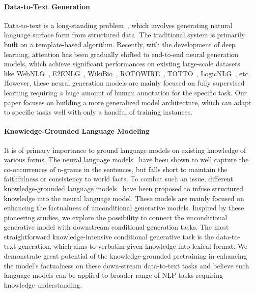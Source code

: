 \documentclass[11pt,a4paper]{article}
\begin{document}
\paragraph{Data-to-Text Generation}
Data-to-text is a long-standing problem~\cite{kukich1983design,reiter1997building}, which involves generating natural language surface form from structured data. The traditional system is primarily built on a template-based algorithm. Recently, with the development of deep learning, attention has been gradually shifted to end-to-end neural generation models, which achieve significant performances on existing large-scale datasets like WebNLG~\cite{shimorina2018handling}, E2ENLG~\cite{dusek2019e2e}, WikiBio~\cite{lebret2016neural}, ROTOWIRE~\cite{wiseman-etal-2017-challenges}, TOTTO~\cite{parikh2020totto}, LogicNLG~\cite{chen2020logical}, etc. However, these neural generation models are mainly focused on fully supervised learning requiring a huge amount of human annotation for the specific task. Our paper focuses on building a more generalized model architecture, which can adapt to specific tasks well with only a handful of training instances. 

\paragraph{Knowledge-Grounded Language Modeling}
It is of primary importance to ground language models on existing knowledge of various forms. The neural language models~\cite{bengio2003neural} have been shown to well capture the co-occurrences of n-grams in the sentences, but falls short to maintain the faithfulness or consistency to world facts. To combat such an issue, different knowledge-grounded language models~\cite{ahn2016neural,hayashi2019latent,logan2019barack} have been proposed to infuse structured knowledge into the neural language model. These models are mainly focused on enhancing the factualness of unconditional generative models. Inspired by these pioneering studies, we explore the possibility to connect the unconditional generative model with downstream conditional generation tasks. The most straightforward knowledge-intensive conditional generative task is the data-to-text generation, which aims to verbatim given knowledge into lexical format. We demonstrate great potential of the knowledge-grounded pretraining in enhancing the model's factualness on these down-stream data-to-text tasks and believe such language models can be applied to broader range of NLP tasks requiring knowledge understanding. 
\end{document}
